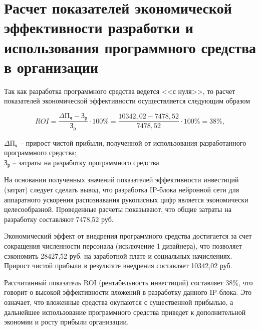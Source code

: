 \section{Расчет показателей экономической эффективности разработки и использования программного средства в организации}\par
\hspace*{12.5 mm}Так как разработка программного средства ведется <<с нуля>>, 
то расчет показателей экономической эффективности осуществляется следующим 
образом

\noindent
\begin{equation}
  {ROI} =  \dfrac{\Delta\text{П}_{\text{ч}} - \text{З}_{\text{р}}}{\text{З}_{\text{р}}} \cdot 100\%= \dfrac{10342,02 - 7478,52}{7478,52}\cdot 100\% = 38\%,
\end{equation}

 $\Delta\text{П}_{\text{ч}}$ – прирост чистой прибыли, полученной
от использования разработанного \hphantom{ где }программного средства;\\ 
\hphantom{где} $\text{З}_{\text{р}}$ – затраты на разработку программного 
средства.


На основании полученных значений показателей эффективности инвестиций (затрат) 
следует сделать вывод, что разработка IP-блока нейронной сети для аппаратного 
ускорения распознавания рукописных цифр является экономически целесообразной. 
Проведенные расчеты показывают, что общие затраты на разработку составляют 
7478,52 руб.

Экономический эффект от внедрения программного средства достигается за счет 
сокращения численности персонала (исключение 1 дизайнера), что позволяет 
сэкономить 28427,52 руб. на заработной плате и социальных начислениях. 
Прирост чистой прибыли в результате внедрения составляет 10342,02 руб.

Рассчитанный показатель ROI (рентабельность инвестиций) составляет 38\%, 
что говорит о высокой эффективности вложений в разработку данного IP-блока. 
Это означает, что вложенные средства окупаются с существенной прибылью, 
а дальнейшее использование программного средства приведет к дополнительной 
экономии и росту прибыли организации.